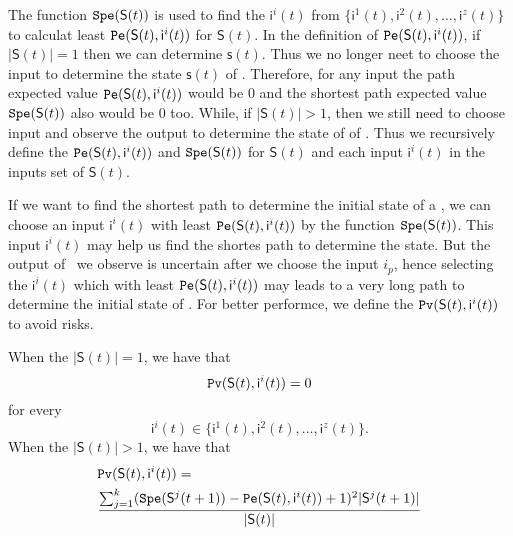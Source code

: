 The function ${\tt Spe}(\mathsf{S}(t))$ is used to find the $\mathsf{ i}^{i}(t)$ from $\{\mathsf{ i}^{1}(t),\mathsf{ i}^{2}(t),\ldots, \mathsf{ i}^{z}(t)\}$ to calculat least ${\tt Pe}(\mathsf{S}(t), \mathsf{ i}^{i}(t))$ for $\mathsf{S}(t)$. In the definition of ${\tt Pe}(\mathsf{S}(t), \mathsf{ i}^{i}(t))$, if $|\mathsf{S}(t)|=1$ then we can determine $\mathsf{s}(t)$. Thus we no longer neet to choose the input to determine the state $\mathsf{s}(t)$ of \BCNs. Therefore, for any input the path expected value ${\tt Pe}(\mathsf{S}(t), \mathsf{ i}^{i}(t))$ would be $0$ and the shortest path expected value ${\tt Spe}(\mathsf{S}(t))$ also would be $0$ too. While, if $|\mathsf{S}(t)|>1$, then we still need to choose input and observe the output to determine the state of of \BCNs. Thus we recursively define the ${\tt Pe}(\mathsf{S}(t), \mathsf{ i}^{i}(t))$ and ${\tt Spe}(\mathsf{S}(t))$ for $\mathsf{S}(t)$ and each input $\mathsf{ i}^{i}(t)$ in the inputs set of $\mathsf{S}(t)$. 

If we want to find the shortest path to determine the initial state of a \BCN, we can choose an input $\mathsf{ i}^{i}(t)$ with least ${\tt Pe}(\mathsf{S}(t), \mathsf{ i}^{i}(t))$ by the function ${\tt Spe}(\mathsf{S}(t))$. This input $\mathsf{ i}^{i}(t)$ may help us find the shortes path to determine the state. But the output of \BCNs\ we observe is uncertain after we choose the input $i_p$, hence selecting the $\mathsf{ i}^{i}(t)$ which with least ${\tt Pe}(\mathsf{S}(t), \mathsf{ i}^{i}(t))$ may leads to a very long path to determine the initial state of \BCNs. For better performce, we define the ${\tt Pv}(\mathsf{S}(t), \mathsf{ i}^{i}(t))$ to avoid risks.%
\begin{definition} 
When the $|\mathsf{S}(t)|=1$, we have that
\[{\tt Pv}(\mathsf{S}(t), \mathsf{ i}^{i}(t))=0\]  for every \[\mathsf{ i}^{i}(t) \in \{\mathsf{ i}^{1}(t),\mathsf{ i}^{2}(t),\ldots, \mathsf{ i}^{z}(t)\}.\]  When the $|\mathsf{S}(t)|>1$, 
we have that\\ 
\begin{equation}
\begin{split}
&{\tt Pv}(\mathsf{S}(t), \mathsf{ i}^{i}(t))=\\
&\frac{\sum_{j=1}^k ({\tt Spe}(\mathsf{S}^{j}(t+1))-{\tt Pe}(\mathsf{S}(t), \mathsf{ i}^{i}(t))+1)^2 |\mathsf{S}^{j}(t+1)|}{ |\mathsf{S}(t)|}
\end{split}
\end{equation}%
\end{definition}


